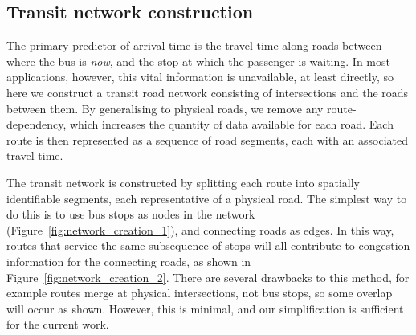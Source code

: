 \subsection{Transit network construction}
\label{sec:network_build}

The primary predictor of arrival time is 
the travel time along roads between where the bus is \emph{now},
and the stop at which the passenger is waiting.
In most applications, however, this vital information is unavailable,
at least directly,
so here we construct a transit road network consisting of intersections
and the roads between them.
By generalising to physical roads,
we remove any route-dependency,
which increases the quantity of data available for each road.
Each route is then represented as a sequence of road segments,
each with an associated travel time.


The transit network is constructed by splitting each route
into spatially identifiable segments,
each representative of a physical road.
The simplest way to do this is to use bus stops as nodes in the network
(Figure~\ref{fig:network_creation_1}),
and connecting roads as edges.
In this way, routes that service the same subsequence of stops
will all contribute to congestion information for the connecting roads,
as shown in Figure~\ref{fig:network_creation_2}.
There are several drawbacks to this method,
for example routes merge at physical intersections, not bus stops,
so some overlap will occur as shown.
However, this is minimal, and our simplification is sufficient for the current work.


